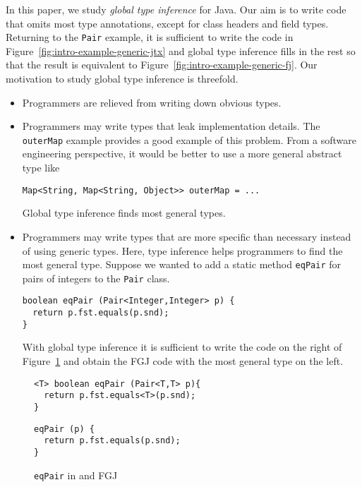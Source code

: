 In this paper, we study \emph{global type inference} for Java. Our aim
is to write code that omits most type annotations, except for class
headers and field types. Returning to the \lstinline{Pair} example, it
is sufficient to write the code in Figure~\ref{fig:intro-example-generic-jtx}
and global type inference fills in the rest so that the result is
equivalent to Figure~\ref{fig:intro-example-generic-fj}. Our
motivation to study global type inference is threefold.
\begin{itemize}
\item Programmers are relieved from writing down obvious types. 
\item Programmers may write types that leak implementation details. The
  \lstinline{outerMap} example provides a good example of this
  problem. From a software engineering
  perspective, it would be better to use a more general abstract type like
\begin{lstlisting}[basicstyle=\ttfamily\fontsize{8}{9.6}\selectfont,style=fgj]
Map<String, Map<String, Object>> outerMap = ...
\end{lstlisting}
  Global type inference finds most general types.
\item Programmers may write types that are more specific than
  necessary instead of using generic types. Here, type
  inference helps programmers to find the most general type. Suppose
  we wanted to add a static  method \texttt{eqPair} for pairs of integers to the
  \lstinline/Pair/ class.
\begin{lstlisting}[basicstyle=\ttfamily\fontsize{8}{9.6}\selectfont,style=fgj]
boolean eqPair (Pair<Integer,Integer> p) {
  return p.fst.equals(p.snd);
}
\end{lstlisting}
  With global type inference it is sufficient to write the code on the
  right of Figure~\ref{fig:equal-pair} and obtain the FGJ code with the most general type on the left.
\end{itemize}
  \begin{figure}[t]
    \begin{minipage}[t]{0.49\linewidth}
\begin{lstlisting}[style=fgj]
<T> boolean eqPair (Pair<T,T> p){
  return p.fst.equals<T>(p.snd);
}
\end{lstlisting}
    \end{minipage}
    \begin{minipage}[t]{0.49\linewidth}
\begin{lstlisting}[style=tfgj]
eqPair (p) {
  return p.fst.equals(p.snd);
}
\end{lstlisting}
    \end{minipage}
    \caption{\lstinline{eqPair} in \TFGJ and FGJ}
    \label{fig:equal-pair}
  \end{figure}

